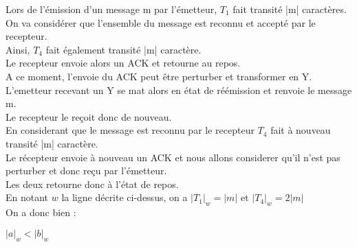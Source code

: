 Lors de l'émission d'un message m par l'émetteur, $T_1$ fait transité |m| caractères.\\
On va considérer que l'ensemble du message est reconnu et accepté par le recepteur.\\
Ainsi, $T_4$ fait également transité |m| caractère.\\
Le recepteur envoie alors un ACK et retourne au repos.\\
A ce moment, l'envoie du ACK peut être perturber et transformer en Y. L'emetteur recevant un Y se mat alors en état de réémission et renvoie le message m.\\
Le recepteur le reçoit donc de nouveau.\\
En considerant que le message est reconnu par le recepteur $T_4$ fait à nouveau transité |m| caractère.\\
Le récepteur envoie à nouveau un ACK et nous allons considerer qu'il n'est pas perturber et donc reçu par l'émetteur.\\
Les deux retourne donc à l'état de repos.\\

En notant $w$ la ligne décrite ci-dessus, on a $|T_1|_w = |m|$ et $|T_4|_w = 2|m|$\\
On a donc bien :
\begin{center}
  $|a|_w < |b|_w$
\end{center}


